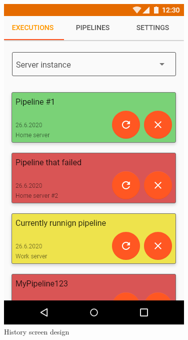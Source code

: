 \begin{figure}\centering
    \begin{minipage}[b]{0.32\textwidth}
    	\includegraphics[width=\textwidth]{pics/xd/History.png}
    	\caption[History]{History screen design}\label{fig:xdHistory}
    \end{minipage}
    \begin{minipage}[b]{0.32\textwidth}

\end{minipage}
\end{figure}
